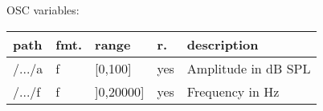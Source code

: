 \begin{snugshade}
{\footnotesize
\label{osctab:tascarapsine}
OSC variables:
\nopagebreak

\begin{tabularx}{\textwidth}{llllX}
\hline
path & fmt. & range & r. & description\\
\hline
/.../a & f & [0,100] & yes & Amplitude in dB SPL\\
/.../f & f & ]0,20000] & yes & Frequency in Hz\\
\hline
\end{tabularx}
}
\end{snugshade}
